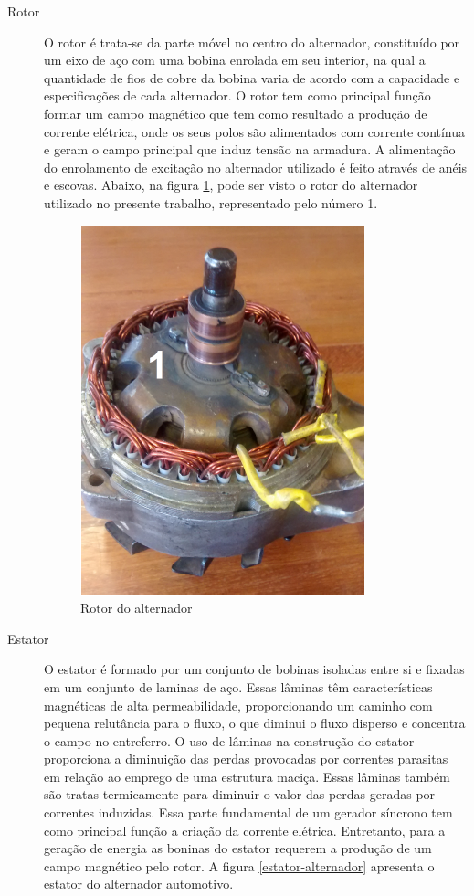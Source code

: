 \begin{description}

\item [Rotor]
O rotor é trata-se da parte móvel no centro do alternador, constituído por um eixo de aço com uma bobina enrolada em seu interior, na qual a quantidade de fios de cobre da bobina varia de acordo com a capacidade e especificações de cada alternador. O rotor tem como principal função formar um campo magnético que tem como resultado a produção de corrente elétrica, onde os seus polos são alimentados com corrente contínua e geram o campo principal que induz tensão na armadura. A alimentação do enrolamento de excitação no alternador utilizado é feito através de anéis e escovas. 
Abaixo, na figura \ref{rotor-alternador}, pode ser visto o rotor do alternador utilizado no presente trabalho, representado pelo número 1.

\begin{figure}[h]
	\centering
	\includegraphics[scale=1]		{figuras/rotor_alternador.png}
	\caption{Rotor do alternador}
	\label{rotor-alternador}
\end{figure}

\item [Estator]

O estator é formado por um conjunto de bobinas isoladas entre si e fixadas em um conjunto de laminas de aço. Essas lâminas têm características magnéticas de alta permeabilidade, proporcionando um caminho com pequena relutância para o fluxo, o que diminui o fluxo disperso e concentra o campo no entreferro. O uso de lâminas na construção do estator proporciona a diminuição das perdas provocadas por correntes parasitas em relação ao emprego de uma estrutura maciça. Essas lâminas também são tratas termicamente para diminuir o valor das perdas geradas por correntes induzidas.
Essa parte fundamental de um gerador síncrono tem como principal função a criação da corrente elétrica. Entretanto, para a geração de energia as boninas do estator requerem a produção de um campo magnético pelo rotor. A figura \ref{estator-alternador} apresenta o estator do alternador automotivo. 


\end{description}

